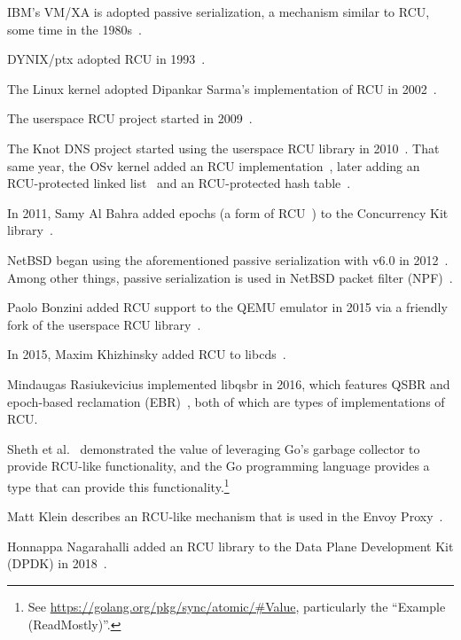 IBM's VM/XA is adopted passive serialization, a mechanism similar to
RCU, some time in the 1980s~\cite{Hennessy89}.

DYNIX/ptx adopted RCU in 1993~\cite{McKenney98,Slingwine95}.

The Linux kernel adopted Dipankar Sarma's implementation of RCU in
2002~\cite{Torvalds2.5.43}.

The userspace RCU project started in 2009~\cite{MathieuDesnoyers2009URCU}.

The Knot DNS project started using the userspace RCU
library in 2010~\cite{LubosSlovak2010KnotDNSRCU}.
That same year, the OSv kernel added an RCU
implementation~\cite{AviKivity2013OSvRCU},
later adding an RCU-protected linked list~\cite{AviKivity2013OSvRCUlist}
and an RCU-protected hash table~\cite{AviKivity2013OSvRCUhash}.

In 2011, Samy Al Bahra added epochs
(a form of RCU~\cite{UCAM-CL-TR-579,KeirFraser2007withoutLocks})
to the Concurrency Kit
library~\cite{SamyAlBahra2011ckEpoch}.

NetBSD began using the aforementioned passive serialization with v6.0 in
2012~\cite{NetBSD2012pserialize}.
Among other things, passive serialization is used in
NetBSD packet filter (NPF)~\cite{MindaugasRasiukevicius2014NPFRCU}.

Paolo Bonzini added RCU support to the QEMU emulator in 2015 via a
friendly fork of the userspace RCU
library~\cite{MikeDay2013RCUqemu,PaoloBonzini2013QEMURCU}.

In 2015, Maxim Khizhinsky added RCU to
libcds~\cite{MaxKhiszinsky2015C++RCU}.

Mindaugas Rasiukevicius implemented libqsbr in 2016, which features
QSBR and epoch-based reclamation
(EBR)~\cite{MindaugasRasiukevicius2016libqsbr},
both of which are types of implementations of RCU\@.

Sheth et al.~\cite{HarshalSheth2016goRCU}
demonstrated the value of leveraging Go's garbage
collector to provide RCU-like functionality, and
the Go programming language provides a  type that can
provide this functionality.\footnote{
	See \url{https://golang.org/pkg/sync/atomic/\#Value}, particularly
	the ``Example (ReadMostly)''.}

Matt Klein describes an RCU-like mechanism that is used in the Envoy
Proxy~\cite{MattKlein2017EnvoyRCU}.

Honnappa Nagarahalli added an RCU library to the Data Plane Development
Kit (DPDK) in 2018~\cite{HonnappaNagarahalli2018dpdkRCU}.

